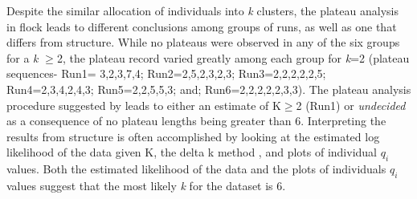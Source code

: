 Despite the similar allocation of individuals into \textit{k} clusters, the 
plateau analysis in {\sc flock} leads to different conclusions among groups of runs, as well as 
one that differs from {\sc structure}. While no plateaus were observed in any of the six groups 
for a \textit{k} $\geq$2, the plateau record varied greatly among each
 group for \textit{k}=2 (plateau  sequences- Run1= 3,2,3,7,4; Run2=2,5,2,3,2,3; Run3=2,2,2,2,2,5; 
Run4=2,3,4,2,4,3; Run5=2,2,5,5,3; and; Run6=2,2,2,2,2,3,3). The plateau analysis 
procedure suggested by \citet{Duc&Tur2012} leads to 
either an estimate of K$\geq$2 (Run1) or \textit{undecided} as a consequence of no plateau 
lengths being greater than 6. Interpreting the results from {\sc structure} is often accomplished by 
looking at the estimated log likelihood of the data given K, the delta k method \citep{Evannoetal2005}, and plots of 
individual \textit{$q_i$} values. Both the estimated likelihood of the data
and the plots of individuals \textit{$q_i$} values suggest that 
the most likely \textit{k} for the dataset is 6. 

